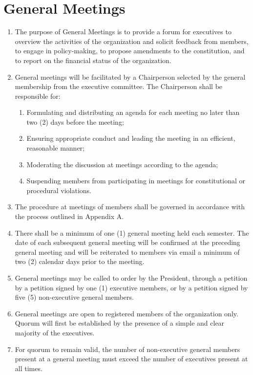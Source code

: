 \documentclass[12pt]{article}
\begin{document}
\section{General Meetings}
\begin{enumerate}[{7}.1]
    \item The purpose of General Meetings is to provide a forum for executives to overview the activities of the organization and solicit feedback from members, to engage in policy-making, to propose amendments to the constitution, and to report on the financial status of the organization.
    \item General meetings will be facilitated by a Chairperson selected by the general membership from the executive committee. The Chairperson shall be responsible for:
    \begin{enumerate}[{7.2}.1]
        \item	Formulating and distributing an agenda for each meeting no later than two (2) days before the meeting;
        \item	Ensuring appropriate conduct and leading the meeting in an efficient, reasonable manner;
        \item	Moderating the discussion at meetings according to the agenda;
        \item	Suspending members from participating in meetings for constitutional or procedural violations. 
    \end{enumerate}
    \item The procedure at meetings of members shall be governed in accordance with the process outlined in Appendix A.
    \item There shall be a minimum of one (1) general meeting held each semester. The date of each subsequent general meeting will be confirmed at the preceding general meeting and will be reiterated to members via email a minimum of two (2) calendar days prior to the meeting.
    \item General meetings may be called to order by the President, through a petition by a petition signed by one (1) executive members, or by a petition signed by five (5) non-executive general members. 
    \item General meetings are open to registered members of the organization only. Quorum will first be established by the presence of a simple and clear majority of the executives. 
    \item For quorum to remain valid, the number of non-executive general members present at a general meeting must exceed the number of executives present at all times. 

\end{enumerate}
\end{document}
